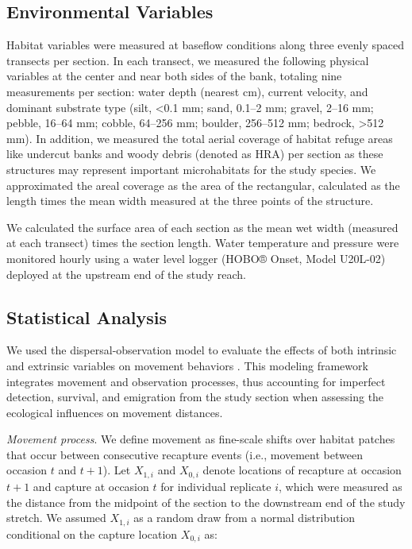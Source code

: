 \documentclass[11pt, class=article, crop=false]{standalone}
\begin{document}
\subsection{Environmental Variables}

Habitat variables were measured at baseflow conditions along three evenly spaced transects per section. In each transect, we measured the following physical variables at the center and near both sides of the bank, totaling nine measurements per section: water depth (nearest cm), current velocity, and dominant substrate type (silt, <0.1 mm; sand, 0.1--2 mm; gravel, 2--16 mm; pebble, 16--64 mm; cobble, 64--256 mm; boulder, 256--512 mm; bedrock, >512 mm). In addition, we measured the total aerial coverage of habitat refuge areas like undercut banks and woody debris (denoted as HRA) per section as these structures may represent important microhabitats for the study species. We approximated the areal coverage as the area of the rectangular, calculated as the length times the mean width measured at the three points of the structure.

We calculated the surface area of each section as the mean wet width (measured at each transect) times the section length. Water temperature and pressure were monitored hourly using a water level logger (HOBO® Onset, Model U20L-02) deployed at the upstream end of the study reach.

\subsection{Statistical Analysis}

We used the dispersal-observation model to evaluate the effects of both intrinsic and extrinsic variables on movement behaviors \citep{teruiModelingDispersalUsing2020}. This modeling framework integrates movement and observation processes, thus accounting for imperfect detection, survival, and emigration from the study section when assessing the ecological influences on movement distances.

\textit{Movement process}. We define movement as fine-scale shifts over habitat patches that occur between consecutive recapture events (i.e., movement between occasion $t$ and $t+1$). Let $X_{1,i}$ and $X_{0,i}$ denote locations of recapture at occasion $t+1$ and capture at occasion $t$ for individual replicate $i$, which were measured as the distance from the midpoint of the section to the downstream end of the study stretch. We assumed $X_{1,i}$ as a random draw from a normal distribution conditional on the capture location $X_{0,i}$ as:    
\end{document}
